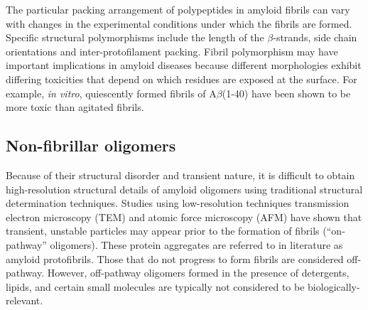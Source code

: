The particular packing arrangement of polypeptides in amyloid fibrils can vary with changes in the experimental conditions under which the fibrils are formed. Specific structural polymorphisms include the length of the $\beta$-strands, side chain orientations and inter-protofilament packing.\cite{Kodali:2007cz} Fibril polymorphism may have important implications in amyloid diseases because different morphologies exhibit differing toxicities that depend on which residues are exposed at the surface. For example, \textit{in vitro}, quiescently formed fibrils of A$\beta$(1-40) have been shown to be more toxic than agitated fibrils.\cite{Petkova:2005p4688} 



\subsection{Non-fibrillar oligomers}

Because of their structural disorder and transient nature, it is difficult to obtain high-resolution structural details of amyloid oligomers using traditional structural determination techniques. Studies using low-resolution techniques transmission electron microscopy (TEM) and atomic force microscopy (AFM) have shown that transient, unstable particles may appear prior to the formation of fibrils (``on-pathway'' oligomers).\cite{Chromy:2003p2575,Ahmed:2010p5694,Caughey:2003jq} These protein aggregates are referred to in literature as amyloid protofibrils.\cite{Chiti:2006fz} Those that do not progress to form fibrils are considered off-pathway.\cite{Kayed:2003en} However, off-pathway oligomers formed in the presence of detergents, lipids, and certain small molecules are typically not considered to be biologically-relevant.\cite{Yu:2009p2873,Laurents:2005ki}

